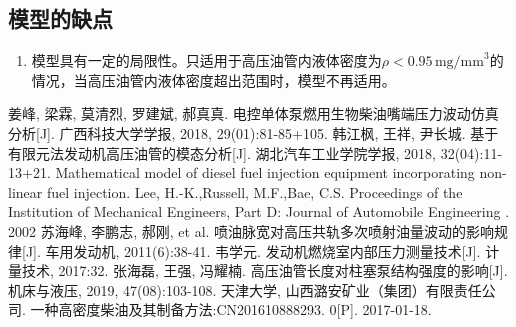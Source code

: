 \documentclass[withoutpreface,bwprint]{cumcmthesis} %
\begin{document}
\subsection{模型的缺点}



\begin{enumerate}

\item 模型具有一定的局限性。只适用于高压油管内液体密度为$\rho<0.95\,\text{mg/mm}^{3}$的情况，当高压油管内液体密度超出范围时，模型不再适用。
\end{enumerate}

\newpage

\begin{thebibliography}{9}%
	
	姜峰, 梁霖, 莫清烈, 罗建斌, 郝真真. 电控单体泵燃用生物柴油嘴端压力波动仿真分析[J]. 广西科技大学学报, 2018, 29(01):81-85+105.
	韩江枫, 王祥, 尹长城. 基于有限元法发动机高压油管的模态分析[J]. 湖北汽车工业学院学报, 2018, 32(04):11-13+21.
	Mathematical model of diesel fuel injection equipment incorporating non-linear fuel injection. Lee, H.-K.,Russell, M.F.,Bae, C.S. Proceedings of the Institution of Mechanical Engineers, Part D: Journal of Automobile Engineering . 2002
	苏海峰, 李鹏志, 郝刚, et al. 喷油脉宽对高压共轨多次喷射油量波动的影响规律[J]. 车用发动机, 2011(6):38-41.
	韦学元. 发动机燃烧室内部压力测量技术[J]. 计量技术, 2017:32.
	张海磊, 王强, 冯耀楠. 高压油管长度对柱塞泵结构强度的影响[J]. 机床与液压, 2019, 47(08):103-108.
	天津大学, 山西潞安矿业（集团）有限责任公司. 一种高密度柴油及其制备方法:CN201610888293. 0[P]. 2017-01-18.
\end{thebibliography}
\end{document}
